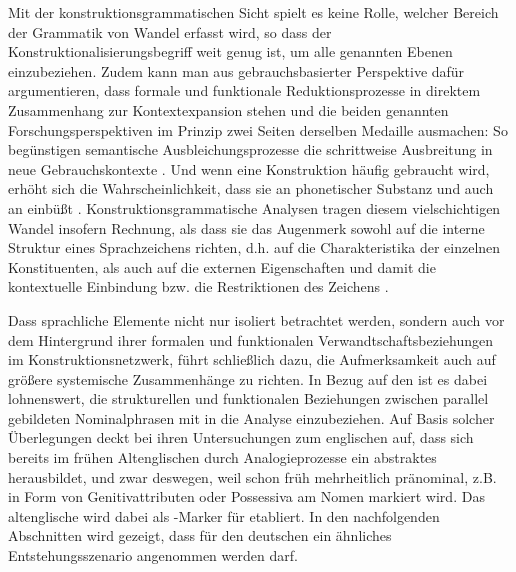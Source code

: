 Mit der konstruktionsgrammatischen Sicht  spielt es keine Rolle, welcher Bereich der Grammatik von Wandel erfasst wird, so dass der Konstruktionalisierungsbegriff weit genug ist, um alle genannten Ebenen einzubeziehen. Zudem kann man aus gebrauchsbasierter Perspektive dafür argumentieren, dass formale und funktionale Reduktionsprozesse in direktem Zusammenhang zur Kontextexpansion  stehen und die beiden genannten Forschungsperspektiven im Prinzip zwei Seiten derselben Medaille ausmachen: So begünstigen semantische Ausbleichungsprozesse die schrittweise Ausbreitung  in neue Gebrauchskontexte \parencite[61]{Traugott2015}. Und wenn eine Konstruktion  häufig gebraucht wird, erhöht sich die Wahrscheinlichkeit, dass sie an phonetischer Substanz und auch an  einbüßt \parencite[20]{Bybee2010}.  Konstruktionsgrammatische Analysen tragen diesem vielschichtigen Wandel insofern Rechnung, als dass sie das Augenmerk sowohl auf die interne Struktur eines Sprachzeichens richten, d.h. auf die Charakteristika der einzelnen Konstituenten, als auch auf die externen Eigenschaften und damit die kontextuelle Einbindung bzw. die Restriktionen des Zeichens  \parencite[zu diesem externen/internen Kontrast s. weiterführend][]{Fried2013}.  

Dass sprachliche Elemente nicht nur isoliert betrachtet werden, sondern auch vor dem Hintergrund ihrer formalen und funktionalen Verwandtschaftsbeziehungen  im Konstruktionsnetzwerk, führt schließlich dazu, die Aufmerksamkeit auch auf größere systemische Zusammenhänge zu richten. In Bezug auf den  ist es dabei lohnenswert, die strukturellen und funktionalen Beziehungen zwischen parallel gebildeten Nominalphrasen  mit in die Analyse einzubeziehen. Auf Basis solcher Überlegungen deckt \textcite{Sommerer2011,Sommerer2012,Sommerer2015} bei ihren Untersuchungen zum englischen  auf, dass sich bereits im frühen Altenglischen durch Analogieprozesse  ein abstraktes  herausbildet, und zwar deswegen, weil  schon früh mehrheitlich pränominal, z.B. in Form von Genitivattributen  oder Possessiva  am Nomen markiert wird. Das altenglische   wird dabei als -Marker für  etabliert. In den nachfolgenden Abschnitten wird gezeigt, dass für den deutschen  ein ähnliches Entstehungsszenario angenommen werden darf.

